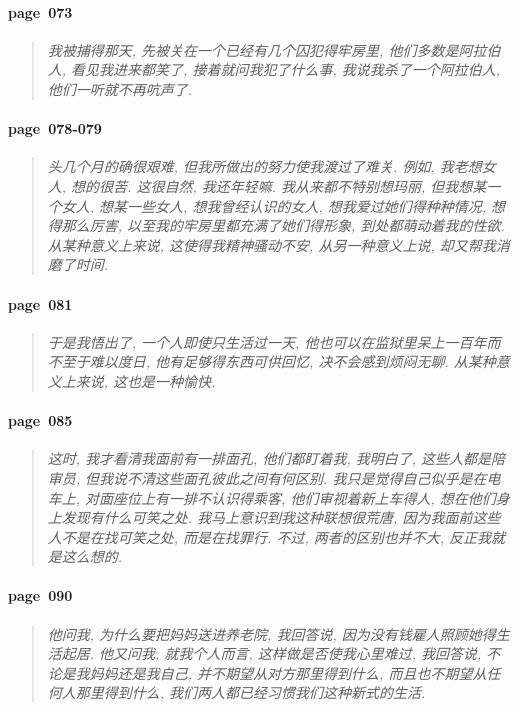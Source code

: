 \paragraph*{page~073}
\begin{quotation}
    \itshape
    我被捕得那天, 先被关在一个已经有几个囚犯得牢房里, 他们多数是阿拉伯人, 看见我进来都笑了, 接着就问我犯了什么事, 我说我杀了一个阿拉伯人, 他们一听就不再吭声了. 
\end{quotation}

\paragraph*{page~078-079}
\begin{quotation}
    \itshape
    头几个月的确很艰难, 但我所做出的努力使我渡过了难关. 例如, 我老想女人, 想的很苦. 这很自然, 我还年轻嘛. 我从来都不特别想玛丽, 但我想某一个女人, 想某一些女人, 想我曾经认识的女人, 想我爱过她们得种种情况, 想得那么厉害, 以至我的牢房里都充满了她们得形象, 到处都萌动着我的性欲. 从某种意义上来说, 这使得我精神骚动不安, 从另一种意义上说, 却又帮我消磨了时间. 
\end{quotation}

\paragraph*{page~081}
\begin{quotation}
    \itshape
    于是我悟出了, 一个人即使只生活过一天, 他也可以在监狱里呆上一百年而不至于难以度日, 他有足够得东西可供回忆, 决不会感到烦闷无聊. 从某种意义上来说, 这也是一种愉快. 
\end{quotation}

\paragraph*{page~085}
\begin{quotation}
    \itshape
    这时, 我才看清我面前有一排面孔, 他们都盯着我, 我明白了, 这些人都是陪审员, 但我说不清这些面孔彼此之间有何区别. 我只是觉得自己似乎是在电车上, 对面座位上有一排不认识得乘客, 他们审视着新上车得人, 想在他们身上发现有什么可笑之处. 我马上意识到我这种联想很荒唐, 因为我面前这些人不是在找可笑之处, 而是在找罪行. 不过, 两者的区别也并不大, 反正我就是这么想的. 
\end{quotation}

\paragraph*{page~090}
\begin{quotation}
    \itshape
    他问我, 为什么要把妈妈送进养老院, 我回答说, 因为没有钱雇人照顾她得生活起居. 他又问我, 就我个人而言, 这样做是否使我心里难过, 我回答说, 不论是我妈妈还是我自己, 并不期望从对方那里得到什么, 而且也不期望从任何人那里得到什么, 我们两人都已经习惯我们这种新式的生活.     
\end{quotation}

